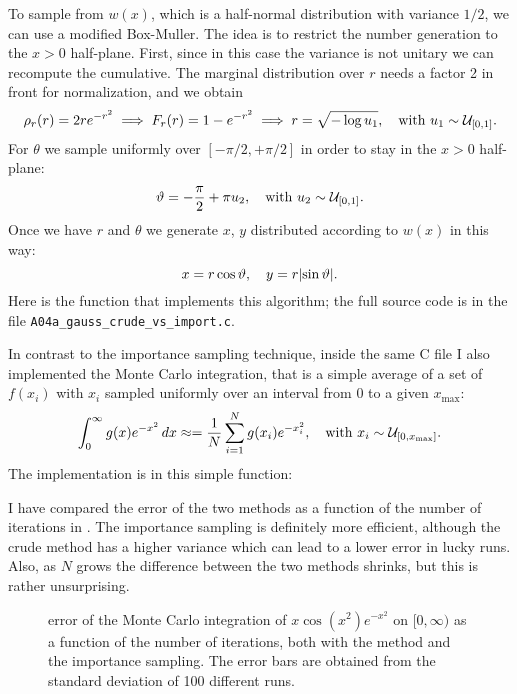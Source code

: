 \documentclass{gulartcl}
\begin{document}
To sample from $w(x)$, which is a half-normal distribution with variance $1/2$,
we can use a modified Box-Muller. The idea is to restrict the number generation
to the $x > 0$ half-plane. First, since in this case the variance is not unitary
we can recompute the cumulative. The marginal distribution over $r$ needs a
factor \num{2} in front for normalization, and we obtain
\begin{equation}
    \rho_r(r) = 2re^{-r^{2}} \implies F_r(r) = 1 - e^{-r^{2}} \implies
    r = \sqrt{-\log u_1}, \quad\text{with } u_1 \sim \mathcal{U}_{[0, 1]}.
\end{equation}
For $\theta$ we sample uniformly over $[-\pi/2, +\pi/2]$ in order to stay in the
$x > 0$ half-plane:
\begin{equation}
    \vartheta = -\frac{\pi}{2} + \pi u_2, \quad
    \text{with } u_2 \sim \mathcal{U}_{[0, 1]}.
\end{equation}
Once we have $r$ and $\theta$ we generate $x$, $y$ distributed according to
$w(x)$ in this way:
\begin{equation}
    x = r \cos\theta,\quad y = r\abs{\sin\theta}.
\end{equation}
Here is the function that implements this algorithm; the full source code is in
the file \texttt{A04a\_gauss\_crude\_vs\_import.c}.


In contrast to the importance sampling technique, inside the same C file I also
implemented the  Monte Carlo integration, that is a simple
average of a set of $f(x_i)$ with $x_i$ sampled uniformly over an interval from
$0$ to a given $x_{\mathrm{max}}$:
\begin{equation}
    \int_{0}^{\infty} g(x) e^{-x^{2}}\, dx \approx
    = \frac{1}{N} \sum_{i = 1}^{N} g(x_i) e^{-x_i^2}, \quad
    \text{with } x_i \sim \mathcal{U}_{[0, x_{\mathrm{max}}]}.
\end{equation}
The implementation is in this simple function:


I have compared the error of the two methods as a function of the number of
iterations in . The importance sampling is definitely
more efficient, although the crude method has a higher variance which can lead
to a lower error in lucky runs. Also, as $N$ grows the difference between the
two methods shrinks, but this is rather unsurprising.

\begin{figure}
    \centering
    
    \caption{error of the Monte Carlo integration of $x \cos(x^{2}) e^{-x^{2}}$
        on $[0, \infty)$ as a function of the number of iterations, both with
        the  method and the importance sampling. The error bars
        are obtained from the standard deviation of \num{100} different runs.}
    \label{fig:A04a}
\end{figure}
\end{document}
